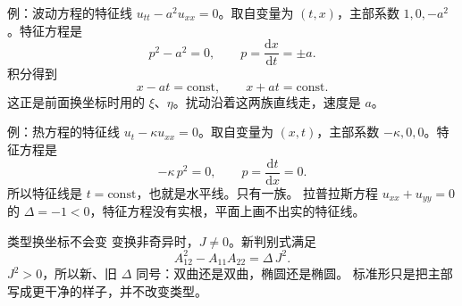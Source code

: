 \documentclass[fontset=windows, chinese, 10pt, xcolor=dvipsnames]{beamer}
\begin{document}
\begin{frame}{例：波动方程的特征线}
  $u_{tt}-a^2 u_{xx}=0$。取自变量为 $(t,x)$，主部系数 $1,0,-a^2$。特征方程是
  \begin{equation*}
    p^2-a^2=0,\qquad p=\frac{\mathrm{d}x}{\mathrm{d}t}=\pm a.
  \end{equation*}
  积分得到
  \begin{equation*}
    x-at=\mathrm{const},
    \qquad
    x+at=\mathrm{const}.
  \end{equation*}
  这正是前面换坐标时用的 $\xi$、$\eta$。扰动沿着这两族直线走，速度是 $a$。
\end{frame}

\begin{frame}{例：热方程的特征线}
  $u_t-\kappa u_{xx}=0$。取自变量为 $(x,t)$，主部系数 $-\kappa,0,0$。特征方程是
  \begin{equation*}
    -\kappa\, p^2=0,\qquad p=\frac{\mathrm{d}t}{\mathrm{d}x}=0.
  \end{equation*}
  所以特征线是 $t=\mathrm{const}$，也就是水平线。只有一族。
  \vspace{0.35em}
  拉普拉斯方程 $u_{xx}+u_{yy}=0$ 的 $\Delta=-1<0$，特征方程没有实根，平面上画不出实的特征线。
\end{frame}

\begin{frame}{类型换坐标不会变}
  变换非奇异时，$J\neq 0$。新判别式满足
  \begin{equation*}
    A_{12}^2-A_{11}A_{22}=\Delta\, J^2.
  \end{equation*}
  $J^2>0$，所以新、旧 $\Delta$ 同号：双曲还是双曲，椭圆还是椭圆。
  \vspace{0.35em}
  标准形只是把主部写成更干净的样子，并不改变类型。
\end{frame}
\end{document}
